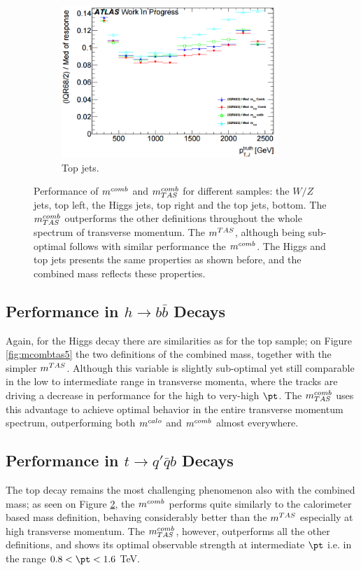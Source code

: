\begin{figure}
    \begin{subfigure}[b]{0.45\textwidth}
  \centering
      \includegraphics[width=0.9\textwidth]{jet_part/mcomb/mcombtas4.png}
  \caption[$\mcombtas$ on the boosted tops]{Top jets.}
  \label{fig:mcombtas4}
    \end{subfigure}
\caption{Performance of $m^{comb}$ and $\mcombtas$ for different samples: the $W/Z$ jets, top left, the Higgs jets, top right and the top jets, bottom. The $\mcombtas$ outperforms the other definitions throughout the whole spectrum of transverse momentum. The $m^{TAS}$, although being sub-optimal follows with similar performance the $m^{comb}$. The Higgs and top jets presents the same properties as shown before, and the combined mass reflects these properties. }
\end{figure}

\subsection{Performance in $h\to b\bar{b}$ Decays}
Again, for the Higgs decay there are similarities as for the top sample; on Figure \ref{fig:mcombtas5} the two definitions of the combined mass, together with the simpler $m^{TAS}$. Although this variable is slightly sub-optimal yet still comparable in the low to intermediate range in transverse momenta, where the tracks are driving a decrease in performance for the high to very-high $\pt$. The $\mcombtas$ uses this advantage to achieve optimal behavior in the entire transverse momentum spectrum, outperforming both $m^{calo}$ and $m^{comb}$ almost everywhere.


\subsection{Performance in $t\to q'\bar{q}b$ Decays}
The top decay remains the most challenging phenomenon also with the combined mass; as seen on Figure \ref{fig:mcombtas4}, the $m^{comb}$ performs quite similarly to the calorimeter based mass definition, behaving considerably better than the $m^{TAS}$ especially at high transverse momentum. The $\mcombtas$, however, outperforms all the other definitions, and shows its optimal observable strength at intermediate $\pt$ i.e. in the range $0.8 < \pt < 1.6$ TeV.

